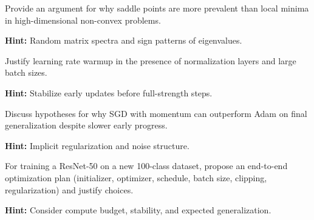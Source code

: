 \begin{problem}
Provide an argument for why saddle points are more prevalent than local minima in high-dimensional non-convex problems.

\textbf{Hint:} Random matrix spectra and sign patterns of eigenvalues.
\end{problem}

\begin{problem}
Justify learning rate warmup in the presence of normalization layers and large batch sizes.

\textbf{Hint:} Stabilize early updates before full-strength steps.
\end{problem}

\begin{problem}
Discuss hypotheses for why SGD with momentum can outperform Adam on final generalization despite slower early progress.

\textbf{Hint:} Implicit regularization and noise structure.
\end{problem}

\begin{problem}
For training a ResNet-50 on a new 100-class dataset, propose an end-to-end optimization plan (initializer, optimizer, schedule, batch size, clipping, regularization) and justify choices.

\textbf{Hint:} Consider compute budget, stability, and expected generalization.
\end{problem}




